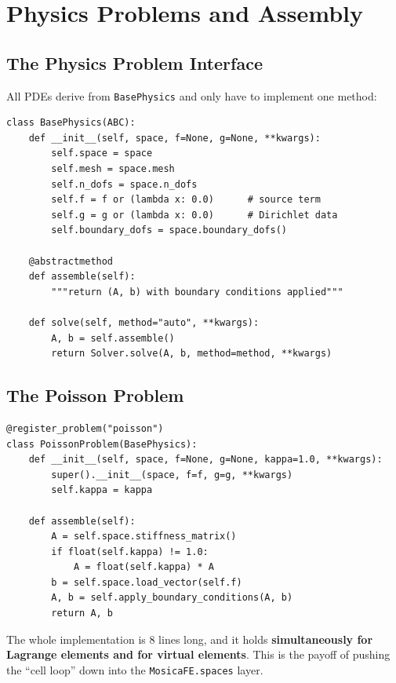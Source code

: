 \documentclass[11pt,oneside]{book}
\theoremstyle{definition}
\theoremstyle{plain}
\newenvironment{important}{%
  \begin{tcolorbox}[colback=blue!5,colframe=blue!45,title=Key Point,fonttitle=\bfseries]%
}{%
  \end{tcolorbox}%
}
\newcommand{\code}[1]{\texttt{#1}}
\newcommand{\module}[1]{\texttt{MosicaFE.#1}}
\begin{document}
\chapter{Physics Problems and Assembly}
\label{chap:physics}

\section{The Physics Problem Interface}

All PDEs derive from \code{BasePhysics} and only have to implement one method:

\begin{lstlisting}[language=MosicaFE,caption={The \code{BasePhysics} interface},label={lst:basephysics}]
class BasePhysics(ABC):
    def __init__(self, space, f=None, g=None, **kwargs):
        self.space = space
        self.mesh = space.mesh
        self.n_dofs = space.n_dofs
        self.f = f or (lambda x: 0.0)      # source term
        self.g = g or (lambda x: 0.0)      # Dirichlet data
        self.boundary_dofs = space.boundary_dofs()

    @abstractmethod
    def assemble(self):
        """return (A, b) with boundary conditions applied"""

    def solve(self, method="auto", **kwargs):
        A, b = self.assemble()
        return Solver.solve(A, b, method=method, **kwargs)
\end{lstlisting}

\section{The Poisson Problem}

\begin{lstlisting}[language=MosicaFE,caption={Assembly of the Poisson problem (complete implementation)}]
@register_problem("poisson")
class PoissonProblem(BasePhysics):
    def __init__(self, space, f=None, g=None, kappa=1.0, **kwargs):
        super().__init__(space, f=f, g=g, **kwargs)
        self.kappa = kappa

    def assemble(self):
        A = self.space.stiffness_matrix()
        if float(self.kappa) != 1.0:
            A = float(self.kappa) * A
        b = self.space.load_vector(self.f)
        A, b = self.apply_boundary_conditions(A, b)
        return A, b
\end{lstlisting}

\begin{important}
The whole implementation is 8 lines long, and it holds \textbf{simultaneously for
Lagrange elements and for virtual elements}. This is the payoff of pushing the
``cell loop'' down into the \module{spaces} layer.
\end{important}
\end{document}
